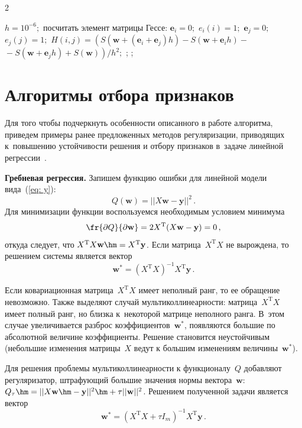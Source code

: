 \begin{multicols}{2}
\begin{algorithmic}
    \STATE$h=10^{-6};$ 
        \STATE посчитать элемент матрицы Гессе:
        \STATE $\mathbf{e}_i=0;$ 
        \STATE $e_i(i)=1;$
        \STATE $\mathbf{e}_j=0;$
        \STATE $e_j(j)=1;$
        \STATE $H(i,j) =
        \left(S(\mathbf{w}+(\mathbf{e}_i+\mathbf{e}_j)h)-S(\mathbf{w}+\mathbf{e}_{i}h)-{}\right.$
        \STATE $\left.{}-S(\mathbf{w}+\mathbf{e}_{j}h)+S(\mathbf{w})\right)/h^2;$
        \ENDFOR
        \EXIT ;
    \ENDFOR
    \EXIT ;
\end{algorithmic}

\section{Алгоритмы отбора признаков}

Для того чтобы подчеркнуть особенности описанного в работе
алгоритма, приведем примеры ранее предложенных методов
регуляризации, приводящих к~повышению устойчивости решения и  отбору
признаков в~задаче линейной регрессии~\cite{lasso, ridzh2}.

\smallskip

\textbf{Гребневая регрессия.}
Запишем функцию ошибки для линейной модели вида~(\ref{eq: y}):
$$
Q(\mathbf{w})=||X\mathbf{w}-\mathbf{y}||^2\,.
$$
Для минимизации функции воспользуемся необходимым условием минимума
$$
\fr{\partial Q}{\partial \mathbf{w}}=2X^{\mathrm{T}}(X\mathbf{w}-\mathbf{y})=0\,,
$$
откуда следует, что $X^{\mathrm{T}}X\mathbf{w}\hm=X^{\mathrm{T}}\mathbf{y}$. 
Если матрица~$X^{\mathrm{T}}X$ не вырождена, то решением системы является вектор
$$
\mathbf{w}^{*}=\left(X^{\mathrm{T}}X\right)^{-1}X^{\mathrm{T}}\mathbf{y}\,.
$$

Если ковариационная матрица~$X^{\mathrm{T}}X$ имеет неполный ранг, то ее
обращение невозможно.  Также выделяют случай мультиколлинеарности:
матрица~$X^{\mathrm{T}}X$ имеет полный ранг, но близка к~некоторой матрице
неполного ранга. В~этом случае увеличивается разброс
коэффициентов~$\mathbf{w}^{*}$, появляются большие по абсолютной
величине коэффициенты. Решение становится неустойчивым (небольшие
изменения матрицы~$X$ ведут к большим изменениям
величины~$\mathbf{w}^{*}$).

Для решения проблемы мультиколлинеарности к функционалу~$Q$
добавляют регуляризатор, штрафующий большие значения нормы
вектора~$\mathbf{w}$:
$Q_\tau\hm=||X\mathbf{w}\hm-\mathbf{y}||^2\hm+\tau||\mathbf{w}||^2$. Решением
полученной задачи является вектор
$$
\mathbf{w}^{*}=\left(X^{\mathrm{T}}X+\tau I_m\right)^{-1}X^{\mathrm{T}}\mathbf{y}\,.
$$


\end{multicols}
